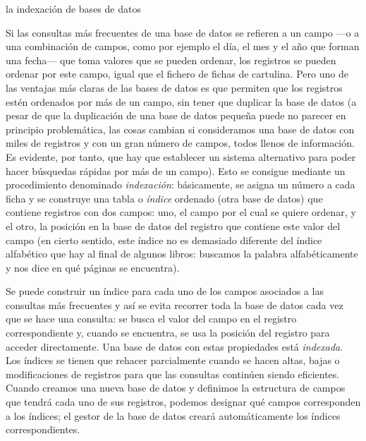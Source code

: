 \begin{persabermes}{la indexación de bases de datos} 

Si las consultas más frecuentes de una base de datos se refieren a un campo ---o a una combinación de campos, como por ejemplo el día, el mes y el año que forman una fecha--- que toma valores que se pueden ordenar, los registros se pueden ordenar por este campo, igual que el fichero de fichas de cartulina. Pero uno de las ventajas más claras de las bases de datos es que permiten que los registros estén ordenados por más de un campo, sin tener que duplicar la base de datos (a pesar de que la duplicación de una base de datos pequeña puede no parecer en principio problemática, las cosas cambian si consideramos una base de datos con miles de registros y con un gran número de campos, todos llenos de información. Es evidente, por tanto, que hay que establecer un sistema alternativo para poder hacer búsquedas rápidas por más de un campo). Esto se consigue mediante un procedimiento denominado \emph{indexación}: básicamente, se asigna un número a cada ficha y se construye una tabla o \emph{índice} ordenado (otra base de datos) que contiene registros con dos campos: uno, el campo por el cual se quiere ordenar, y el otro, la posición en la base de datos del registro que contiene este valor del campo (en cierto sentido, este índice no es demasiado diferente del índice alfabético que hay al final de algunos libros: buscamos la palabra alfabéticamente y nos dice en qué páginas se encuentra). 

Se puede construir un índice para cada uno de los campos asociados a las consultas más frecuentes y así se evita recorrer toda la base de datos cada vez que se hace una consulta: se busca el valor del campo en el registro correspondiente y, cuando se encuentra, se usa la posición del registro para acceder directamente. Una base de datos con estas propiedades está \emph{indexada}. 
Los índices se tienen que rehacer parcialmente cuando se hacen altas, bajas o modificaciones de registros para que las consultas continúen siendo eficientes. Cuando creamos una nueva base de datos y definimos la estructura de campos que tendrá cada uno de sus registros, podemos designar qué campos corresponden a los índices; el gestor de la base de datos creará automáticamente los índices correspondientes. 


\end{persabermes}
